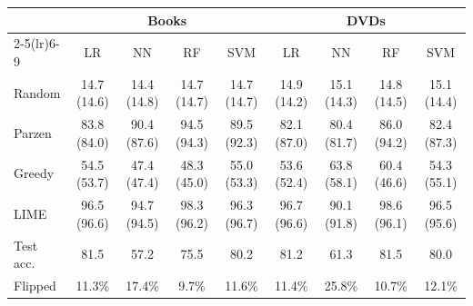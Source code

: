 \begin{tabular}{lcccccccc}
\toprule
 & \multicolumn{4}{c}{Books} & \multicolumn{4}{c}{DVDs} \\
\cmidrule(lr){2-5}\cmidrule(lr){6-9}
 & LR & NN & RF & SVM & LR & NN & RF & SVM \\
\midrule
Random & 14.7 {\scriptsize(14.6)} & 14.4 {\scriptsize(14.8)} & 14.7 {\scriptsize(14.7)} & 14.7 {\scriptsize(14.7)} & 14.9 {\scriptsize(14.2)} & 15.1 {\scriptsize(14.3)} & 14.8 {\scriptsize(14.5)} & 15.1 {\scriptsize(14.4)} \\
Parzen & 83.8 {\scriptsize(84.0)} & 90.4 {\scriptsize(87.6)} & 94.5 {\scriptsize(94.3)} & 89.5 {\scriptsize(92.3)} & 82.1 {\scriptsize(87.0)} & 80.4 {\scriptsize(81.7)} & 86.0 {\scriptsize(94.2)} & 82.4 {\scriptsize(87.3)} \\
Greedy & 54.5 {\scriptsize(53.7)} & 47.4 {\scriptsize(47.4)} & 48.3 {\scriptsize(45.0)} & 55.0 {\scriptsize(53.3)} & 53.6 {\scriptsize(52.4)} & 63.8 {\scriptsize(58.1)} & 60.4 {\scriptsize(46.6)} & 54.3 {\scriptsize(55.1)} \\
LIME & 96.5 {\scriptsize(96.6)} & 94.7 {\scriptsize(94.5)} & 98.3 {\scriptsize(96.2)} & 96.3 {\scriptsize(96.7)} & 96.7 {\scriptsize(96.6)} & 90.1 {\scriptsize(91.8)} & 98.6 {\scriptsize(96.1)} & 96.5 {\scriptsize(95.6)} \\
\midrule
Test acc. & 81.5 & 57.2 & 75.5 & 80.2 & 81.2 & 61.3 & 81.5 & 80.0 \\
Flipped & 11.3\% & 17.4\% & 9.7\% & 11.6\% & 11.4\% & 25.8\% & 10.7\% & 12.1\% \\
\bottomrule
\end{tabular}
